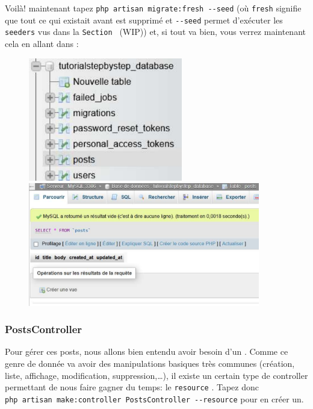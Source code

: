 \documentclass[internal]{nhitec_design}
\begin{document}
Voilà! maintenant tapez \verb|php artisan migrate:fresh --seed| (où \verb|fresh| signifie que tout ce qui existait avant est supprimé et \verb|--seed| permet d'exécuter les \texttt{seeders} vus dans la \texttt{Section~} (WIP)) et, si tout va bien, vous verrez maintenant cela en allant dans \phpmyadmin{}:

\begin{figure}[!h]
    \centering
    \begin{minipage}{0.49\textwidth}
         \centering
         \includegraphics[width=0.6\textwidth]{figures-C1/db_posts_1.pdf}
    \end{minipage}
    \begin{minipage}{0.49\textwidth}
         \centering
         \includegraphics[width=0.9\textwidth]{figures-C1/db_posts_2.pdf}
    \end{minipage}
\end{figure}

\subsubsection[PostsController][laravel.com/docs/10.x/controllers\#resource-controllers]{PostsController}

Pour gérer ces posts, nous allons bien entendu avoir besoin d'un \controller{}. Comme ce genre de donnée va avoir des manipulations basiques très communes (création, liste, affichage, modification, suppression,\ldots), il existe un certain type de controller permettant de nous faire gagner du temps: le \texttt{resource} \controller{}. Tapez donc \\
\verb|php artisan make:controller PostsController --resource| pour en créer un.
\end{document}
